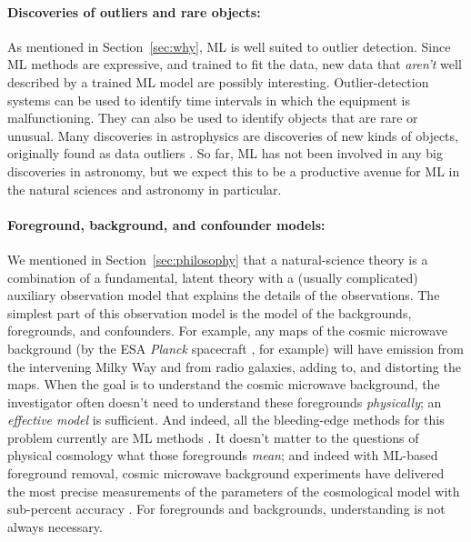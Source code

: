 \documentclass[10pt]{article}
\newcommand{\sectionname}{Section}
\newcommand{\secref}[1]{\sectionname~\ref{#1}}
\begin{document}
\paragraph{Discoveries of outliers and rare objects:}
As mentioned in \secref{sec:why}, ML is well suited to outlier detection.
Since ML methods are expressive, and trained to fit the data, new data that \emph{aren't} well described by a trained ML model are possibly interesting.
Outlier-detection systems can be used to identify time intervals in which the equipment is malfunctioning.
They can also be used to identify objects that are rare or unusual.
Many discoveries in astrophysics are discoveries of new kinds of objects, originally found as data outliers \cite{quasars, voorwerp}.
So far, ML has not been involved in any big discoveries in astronomy, but we expect this to be a productive avenue for ML in the natural sciences and astronomy in particular.

\paragraph{Foreground, background, and confounder models:}
We mentioned in \secref{sec:philosophy} that a natural-science theory is a combination of a fundamental, latent theory with a (usually complicated) auxiliary observation model that explains the details of the observations.
The simplest part of this observation model is the model of the backgrounds, foregrounds, and confounders.
For example, any maps of the cosmic microwave background (by the ESA \textsl{Planck} spacecraft \cite{planck_maps}, for example) will have emission from the intervening Milky Way and from radio galaxies, adding to, and distorting the maps.
When the goal is to understand the cosmic microwave background, the investigator often doesn't need to understand these foregrounds \emph{physically}; an \emph{effective model} is sufficient.
And indeed, all the bleeding-edge methods for this problem currently are ML methods \cite{cmb_foregrounds}.
It doesn't matter to the questions of physical cosmology what those foregrounds \emph{mean}; and indeed with ML-based foreground removal, cosmic microwave background experiments have delivered the most precise measurements of the parameters of the cosmological model with sub-percent accuracy \cite{planck_parameters}.
For foregrounds and backgrounds, understanding is not always necessary.
\end{document}
